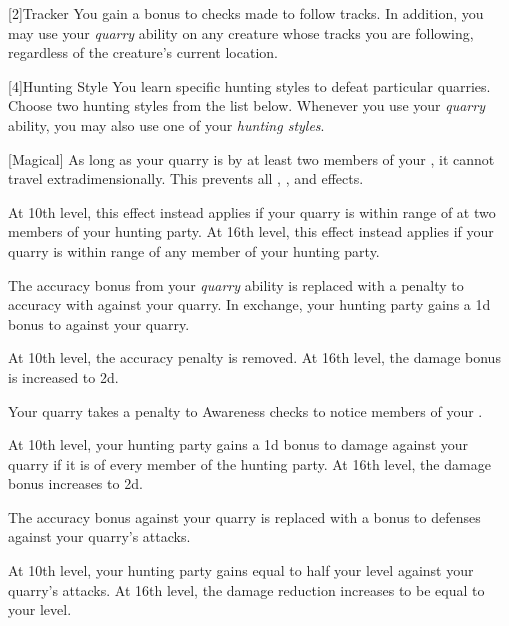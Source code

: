         [2]{Tracker}
        You gain a  bonus to checks made to follow tracks.
        In addition, you may use your \textit{quarry} ability on any creature whose tracks you are following, regardless of the creature's current location.

        [4]{Hunting Style}
        You learn specific hunting styles to defeat particular quarries.
        Choose two hunting styles from the list below.
        Whenever you use your \textit{quarry} ability, you may also use one of your \textit{hunting styles}.
        {
            [Magical]
            As long as your quarry is  by at least two members of your , it cannot travel extradimensionally.
            This prevents all , , and  effects.
            \par At 10th level, this effect instead applies if your quarry is within \rngmed range of at two members of your hunting party.
            At 16th level, this effect instead applies if your quarry is within \rnglong range of any member of your hunting party.

            The accuracy bonus from your \textit{quarry} ability is replaced with a  penalty to accuracy with  against your quarry.
            In exchange, your hunting party gains a \plus1d bonus to  against your quarry.
            \par At 10th level, the accuracy penalty is removed.
            At 16th level, the damage bonus is increased to \plus2d.

            Your quarry takes a  penalty to Awareness checks to notice members of your .
            \par At 10th level, your hunting party gains a \plus1d bonus to damage against your quarry if it is \unaware of every member of the hunting party.
            At 16th level, the damage bonus increases to \plus2d.

            The accuracy bonus against your quarry is replaced with a  bonus to defenses against your quarry's attacks.
            \par At 10th level, your hunting party gains  equal to half your level against your quarry's attacks.
            At 16th level, the damage reduction increases to be equal to your level.

}
